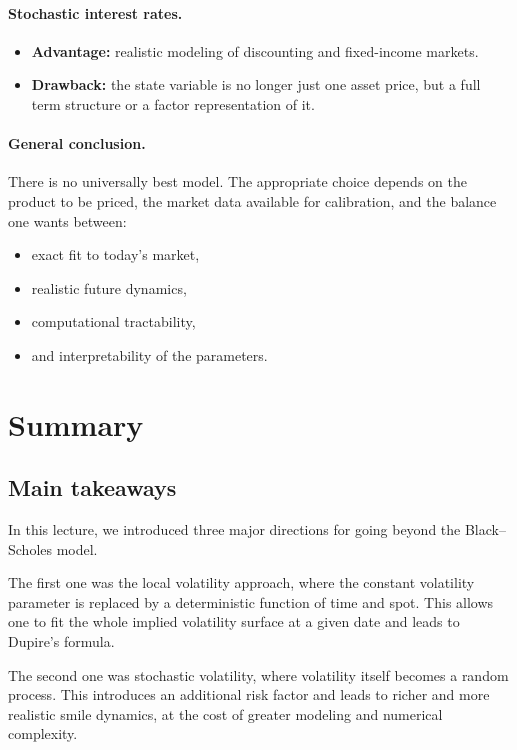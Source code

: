 \documentclass[11pt]{article}
\theoremstyle{plain}
\theoremstyle{definition}
\theoremstyle{remark}
\begin{document}
\paragraph{Stochastic interest rates.}
\begin{itemize}[leftmargin=1.4em]
    \item \textbf{Advantage:} realistic modeling of discounting and
    fixed-income markets.
    \item \textbf{Drawback:} the state variable is no longer just one
    asset price, but a full term structure or a factor representation of
    it.
\end{itemize}

\paragraph{General conclusion.}
There is no universally best model.
The appropriate choice depends on the product to be priced, the market
data available for calibration, and the balance one wants between:
\begin{itemize}[leftmargin=1.4em]
    \item exact fit to today's market,
    \item realistic future dynamics,
    \item computational tractability,
    \item and interpretability of the parameters.
\end{itemize}

\section{Summary}

\subsection{Main takeaways}

In this lecture, we introduced three major directions for going beyond
the Black--Scholes model.

The first one was the local volatility approach, where the constant
volatility parameter is replaced by a deterministic function of time and
spot.
This allows one to fit the whole implied volatility surface at a given
date and leads to Dupire's formula.

The second one was stochastic volatility, where volatility itself
becomes a random process.
This introduces an additional risk factor and leads to richer and more
realistic smile dynamics, at the cost of greater modeling and numerical
complexity.
\end{document}
